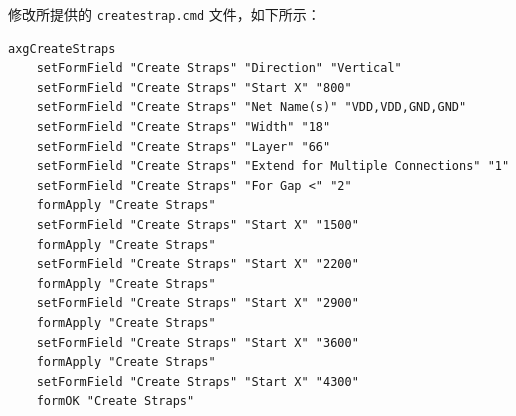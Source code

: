 \documentclass[12pt,hyperref,a4paper,UTF8]{ctexart}
\begin{document}
修改所提供的 \texttt{createstrap.cmd} 文件，如下所示：
\newpage
\begin{lstlisting}[style=tclstyle,name=createstrap.cmd]
    axgCreateStraps
    setFormField "Create Straps" "Direction" "Vertical"
    setFormField "Create Straps" "Start X" "800"
    setFormField "Create Straps" "Net Name(s)" "VDD,VDD,GND,GND"
    setFormField "Create Straps" "Width" "18"
    setFormField "Create Straps" "Layer" "66"
    setFormField "Create Straps" "Extend for Multiple Connections" "1"
    setFormField "Create Straps" "For Gap <" "2"
    formApply "Create Straps"
    setFormField "Create Straps" "Start X" "1500"
    formApply "Create Straps"
    setFormField "Create Straps" "Start X" "2200"
    formApply "Create Straps"
    setFormField "Create Straps" "Start X" "2900"
    formApply "Create Straps"
    setFormField "Create Straps" "Start X" "3600"
    formApply "Create Straps"
    setFormField "Create Straps" "Start X" "4300"
    formOK "Create Straps"
\end{lstlisting}
\end{document}
